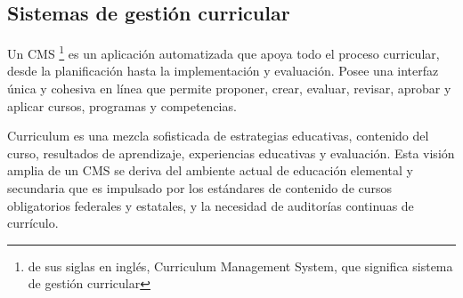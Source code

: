 


\subsection{Sistemas de gestión curricular}
Un CMS \footnote{de sus siglas en inglés, Curriculum Management System, que significa sistema de gestión curricular} es un aplicación automatizada que apoya todo el proceso curricular, desde la planificación hasta la implementación y evaluación. Posee una interfaz única y cohesiva en línea que permite proponer, crear, evaluar, revisar, aprobar y aplicar cursos, programas y competencias.

Curriculum es una mezcla sofisticada de estrategias educativas, contenido del curso, resultados de aprendizaje, experiencias educativas y evaluación\citep{harden2001amee}. Esta visión amplia de un CMS se deriva del ambiente actual de educación elemental y secundaria que es impulsado por los estándares de contenido de cursos obligatorios federales y estatales, y la necesidad de auditorías continuas de currículo\citep{west2000technology}.

